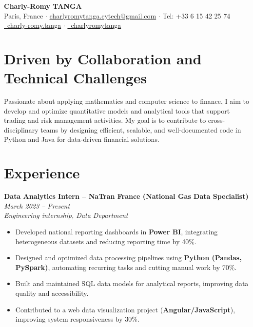 \documentclass[10pt, letterpaper]{article}
\begin{document}
\begin{center}
    {\Large \textbf{Charly-Romy TANGA}}\\[3pt]
    {\small Paris, France \quad$\cdot$\quad 
    \href{mailto:charlyromytanga.cytech@gmail.com}{charlyromytanga.cytech@gmail.com} \quad$\cdot$\quad
    Tel: +33 6 15 42 25 74}\\[3pt]
    \href{https://linkedin.com/in/charly-romy.tanga}{\faLinkedinIn\ charly-romy.tanga} \quad$\cdot$\quad
    \href{https://github.com/charlyromytanga}{\faGithub\ charlyromytanga}
\end{center}

\vspace{0.2cm}

\section*{Driven by Collaboration and Technical Challenges}
Passionate about applying mathematics and computer science to finance, I aim to develop and optimize quantitative models and analytical tools that support trading and risk management activities. My goal is to contribute to cross-disciplinary teams by designing efficient, scalable, and well-documented code in Python and Java for data-driven financial solutions.

\section*{Experience}

\textbf{Data Analytics Intern – NaTran France (National Gas Data Specialist)} \hfill \textit{March 2023 – Present}\\
\textit{Engineering internship, Data Department}
\begin{itemize}
    \item Developed national reporting dashboards in \textbf{Power BI}, integrating heterogeneous datasets and reducing reporting time by 40\%.
    \item Designed and optimized data processing pipelines using \textbf{Python (Pandas, PySpark)}, automating recurring tasks and cutting manual work by 70\%.
    \item Built and maintained SQL data models for analytical reports, improving data quality and accessibility.
    \item Contributed to a web data visualization project (\textbf{Angular/JavaScript}), improving system responsiveness by 30\%.
\end{itemize}
\end{document}

